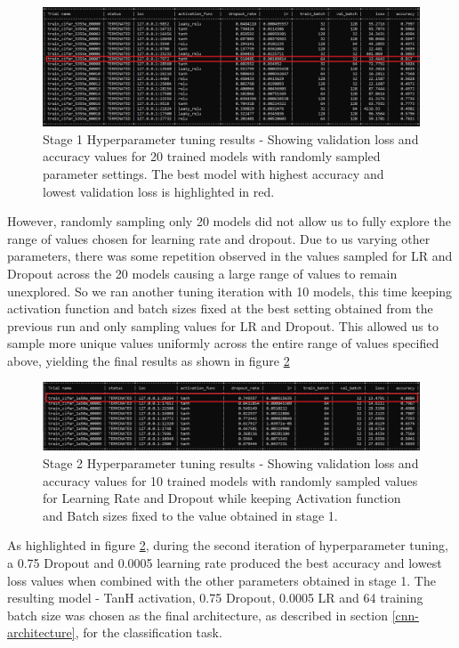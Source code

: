 \documentclass{l4proj}
\begin{document}
\begin{figure}[h]
    \centering
    \includegraphics[scale=0.5]{images/tuning-stage1.png}
    \caption{Stage 1 Hyperparameter tuning results - Showing validation loss and accuracy values for 20 trained models with randomly sampled parameter settings. The best model with highest accuracy and lowest validation loss is highlighted in red. }
    \label{fig:tuning-stage-1}
\end{figure}

However, randomly sampling only 20 models did not allow us to fully explore the range of values chosen for learning rate and dropout. Due to us varying other parameters, there was some repetition observed in the values sampled for LR and Dropout across the 20 models causing a large range of values to remain unexplored. So we ran another tuning iteration with 10 models, this time keeping activation function and batch sizes fixed at the best setting obtained from the previous run and only sampling values for LR and Dropout. This allowed us to sample more unique values uniformly across the entire range of values specified above, yielding the final results as shown in figure \ref{fig:tuning-stage-2}

\begin{figure}[h]
    \centering
    \includegraphics[scale=0.5]{images/tuning-stage2.png}
    \caption{Stage 2 Hyperparameter tuning results - Showing validation loss and accuracy values for 10 trained models with randomly sampled values for Learning Rate and Dropout while keeping Activation function and Batch sizes fixed to the value obtained in stage 1. }
    \label{fig:tuning-stage-2}
\end{figure}

As highlighted in figure \ref{fig:tuning-stage-2}, during the second iteration of hyperparameter tuning, a 0.75 Dropout and 0.0005 learning rate produced the best accuracy and lowest loss values when combined with the other parameters obtained in stage 1. The resulting model - TanH activation, 0.75 Dropout, 0.0005 LR and 64 training batch size was chosen as the final architecture, as described in section \ref{cnn-architecture}, for the classification task.
\end{document}
